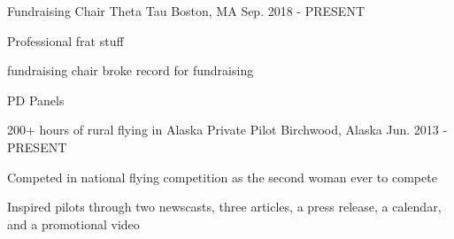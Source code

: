 \begin{cventries}

\cventry
{Fundraising Chair} %
{Theta Tau} %
{Boston, MA} %
{Sep. 2018 - PRESENT} %
{ %
\begin{cvitems}
\item {Professional frat stuff}
\item {fundraising chair broke record for fundraising}
\item {PD Panels}
\end{cvitems}
}


\cventry
{200+ hours of rural flying in Alaska} %
{Private Pilot} %
{Birchwood, Alaska} %
{Jun. 2013 - PRESENT} %
{ %
\begin{cvitems}
\item {Competed in national flying competition as the second woman ever to compete}
\item {Inspired pilots through two newscasts, three articles, a press release, a calendar, and a promotional video}
\end{cvitems}
}


\end{cventries}